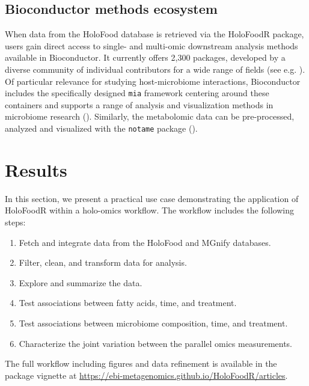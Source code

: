 \documentclass[unnumsec,webpdf,namedate,modern,large]{oup-authoring-template}%
\begin{document}
\vspace{-1em}
\subsection{Bioconductor methods ecosystem}

When data from the HoloFood database is retrieved via the HoloFoodR package, users gain direct access to single- and multi-omic downstream analysis methods available in Bioconductor. It currently offers 2,300 packages, developed by a diverse community of individual contributors for a wide range of fields (see e.g. \cite{gentleman_bioconductor_2004,callahan_bioconductor_2016,amezquita_orchestrating_2020,drnevich_2024}). Of particular relevance for studying host-microbiome interactions, Bioconductor includes the specifically designed \texttt{mia} framework centering around these containers and supports a range of analysis and visualization methods in microbiome research (\cite{mia, miaViz, oma}). Similarly, the metabolomic data can be pre-processed, analyzed and visualized with the \texttt{notame} package (\cite{klavus_2020}).

\section{Results}

In this section, we present a practical use case demonstrating the application of HoloFoodR within a holo-omics workflow. The workflow includes the following steps:

\begin{enumerate}
    \item Fetch and integrate data from the HoloFood and MGnify databases.
    \item Filter, clean, and transform data for analysis.
    \item Explore and summarize the data.
    \item Test associations between fatty acids, time, and treatment.
    \item Test associations between microbiome composition, time, and treatment.
    \item Characterize the joint variation between the parallel omics measurements.
\end{enumerate}

The full workflow including figures and data refinement is available in the package vignette at \url{https://ebi-metagenomics.github.io/HoloFoodR/articles}.
\end{document}
